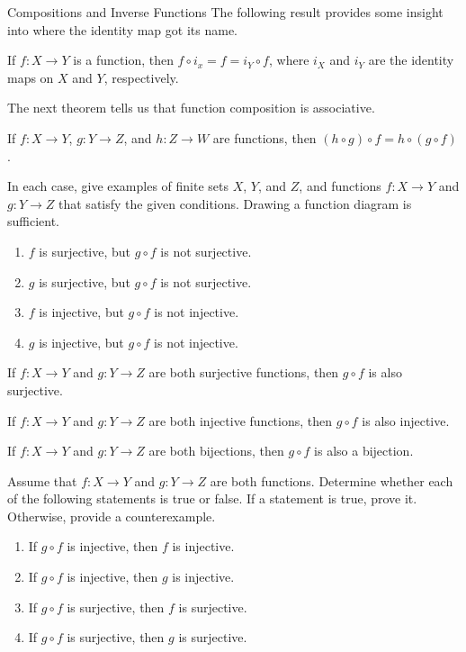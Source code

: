 \begin{section}{Compositions and Inverse Functions}
The following result provides some insight into where the identity map got its name.  

\begin{theorem}
If $f:X\to Y$ is a function, then $f\circ i_x = f = i_Y\circ f$, where $i_X$ and $i_Y$ are the identity maps on $X$ and $Y$, respectively.
\end{theorem}

The next theorem tells us that function composition is associative.

\begin{theorem}
If $f:X\to Y$, $g:Y\to Z$, and $h:Z\to W$ are functions, then $(h\circ g)\circ f = h\circ (g\circ f)$.
\end{theorem}

\begin{problem}
In each case, give examples of finite sets $X$, $Y$, and $Z$, and functions $f:X\to Y$ and $g:Y\to Z$ that satisfy the given conditions.  Drawing a function diagram is sufficient.
\begin{enumerate}[label=\textrm{(\alph*)}]
\item $f$ is surjective, but $g\circ f$ is not surjective.
\item $g$ is surjective, but $g\circ f$ is not surjective.
\item $f$ is injective, but $g\circ f$ is not injective.
\item $g$ is injective, but $g\circ f$ is not injective.
\end{enumerate}
\end{problem}

\begin{theorem}
If $f:X\to Y$ and $g:Y\to Z$ are both surjective functions, then $g\circ f$ is also surjective.
\end{theorem}

\begin{theorem}
If $f:X\to Y$ and $g:Y\to Z$ are both injective functions, then $g\circ f$ is also injective.
\end{theorem}

\begin{corollary}
If $f:X\to Y$ and $g:Y\to Z$ are both bijections, then $g\circ f$ is also a bijection.
\end{corollary}

\begin{problem}
Assume that $f:X\to Y$ and $g:Y\to Z$ are both functions.  Determine whether each of the following statements is true or false. If a statement is true, prove it.  Otherwise, provide a counterexample.
\begin{enumerate}[label=\textrm{(\alph*)}]
\item If $g\circ f$ is injective, then $f$ is injective.
\item If $g\circ f$ is injective, then $g$ is injective.
\item If $g\circ f$ is surjective, then $f$ is surjective.
\item If $g\circ f$ is surjective, then $g$ is surjective.
\end{enumerate}
\end{problem}


\end{section}
